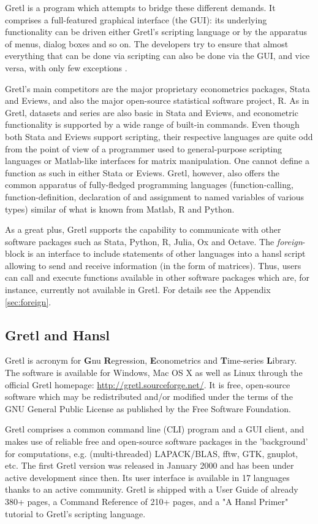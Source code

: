 \documentclass[11pt]{article}
\newcommand{\remph}[1]{{\color{myred}#1}}
\begin{document}
Gretl is a program which attempts to bridge these different demands. It comprises a full-featured graphical interface (the GUI): its underlying
functionality can be driven either Gretl's scripting language or by the apparatus of menus, dialog boxes and so on. The developers try to ensure that almost everything that can be done via scripting can also be done via the GUI, and vice versa, with only few exceptions \citep{Cottrell2017}.

Gretl's main competitors are the major proprietary econometrics packages, Stata and Eviews, and also the major open-source statistical software project, R. As in Gretl, datasets and series are also basic in Stata and Eviews, and econometric functionality is supported by a wide range of built-in commands. Even though both Stata and Eviews support scripting, their respective languages are quite odd from the point of view of a programmer used to general-purpose scripting languages or Matlab-like interfaces for matrix manipulation. \remph{One cannot define a function as
such in either Stata or Eviews.} Gretl, however, also offers the common apparatus of fully-fledged programming languages (function-calling, function-definition, declaration of and assignment to named variables of various types) similar of what is known from Matlab, R and Python.

 As a great plus, Gretl supports the capability to communicate with other software packages such as Stata, Python, R, Julia, Ox and Octave. The \textit{foreign}-block is an interface to include statements of other languages into a hansl script allowing to send and receive information (in the form of matrices). Thus, users can call and execute functions available in other software packages which are, for instance, currently not available in Gretl. For details see the Appendix \ref{sec:foreign}.

\subsection{Gretl and Hansl}
Gretl is acronym for \textbf{G}nu \textbf{R}egression, \textbf{E}conometrics and \textbf{T}ime-series \textbf{L}ibrary. The software is available for Windows, Mac OS X as well as Linux through the official Gretl homepage: \url{http://gretl.sourceforge.net/}. It is free, open-source software which may be redistributed and/or modified under the terms of the GNU General Public License as published by the Free Software Foundation.

Gretl comprises %
a common command line (CLI) program and a GUI client, and makes use of reliable free and open-source software packages in the 'background' for computations, e.g. (multi-threaded) LAPACK/BLAS, fftw, GTK, gnuplot, etc. The first Gretl version was released in January 2000 and has been under active development %
since then. Its user interface is available in 17 languages thanks to an active community. Gretl is shipped with a User Guide of already 380+ pages, a Command Reference of 210+ pages, and a "A Hansl Primer" tutorial to Gretl's scripting language.%
\end{document}
